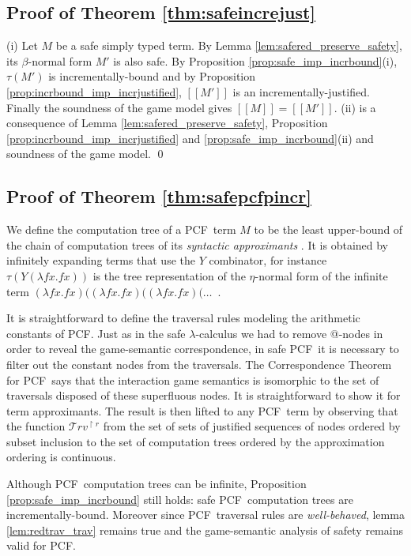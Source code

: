 \documentclass{llncs}
\newcommand\travset{\mathcal{T}rv}
\newcommand{\sem}[1]{{[\![ #1 ]\!]}}
\newcommand\pcf{\textsf{PCF}}
\begin{document}
\subsection{Proof of Theorem \ref{thm:safeincrejust}}
(i) Let $M$ be a safe simply typed term. By Lemma \ref{lem:safered_preserve_safety}, its $\beta$-normal form $M'$ is also safe. By Proposition \ref{prop:safe_imp_incrbound}(i), $\tau(M')$ is incrementally-bound and by Proposition
\ref{prop:incrbound_imp_incrjustified}, $\sem{M'}$ is an
incrementally-justified. Finally the soundness of the game model gives $\sem{M} = \sem{M'}$.
(ii) is a consequence of Lemma \ref{lem:safered_preserve_safety},
Proposition \ref{prop:incrbound_imp_incrjustified}  and 
\ref{prop:safe_imp_incrbound}(ii) and soundness of the game model.
\qed

\subsection{Proof of Theorem \ref{thm:safepcfpincr}}

We define the computation tree of a \pcf\ term $M$ to be the least upper-bound of
the chain of computation trees of its \emph{syntactic approximants} \cite{abramsky:game-semantics-tutorial}.
It is obtained by infinitely expanding terms that use the $Y$ combinator, for instance
$\tau(Y (\lambda f x. f x))$ is
the tree representation of the $\eta$-normal form of the infinite term
$(\lambda f x. f x) ((\lambda f x. f x) ((\lambda f x. f x)  (
\ldots$\ .


It is straightforward to define the traversal rules modeling the arithmetic constants of \pcf. Just as in the safe $\lambda$-calculus we had to remove @-nodes in order to reveal the game-semantic correspondence, in safe \pcf\ it is necessary to filter out the constant nodes from the traversals. The Correspondence Theorem for \pcf\ says that the interaction game semantics is isomorphic to the set of traversals disposed of these superfluous nodes. It is straightforward to show it for term approximants. The result is then lifted to any \pcf\ term by observing that the function $\travset^{\upharpoonright r}$ from the set of sets of justified sequences of nodes ordered by subset inclusion to the set of computation trees ordered by the approximation ordering
is continuous.

Although \pcf\ computation trees can be infinite, Proposition \ref{prop:safe_imp_incrbound} still holds:
safe \pcf\ computation trees are incrementally-bound.
Moreover since \pcf\ traversal rules are \emph{well-behaved}, lemma \ref{lem:redtrav_trav} remains true and the game-semantic analysis of safety remains valid for \pcf.
\end{document}
